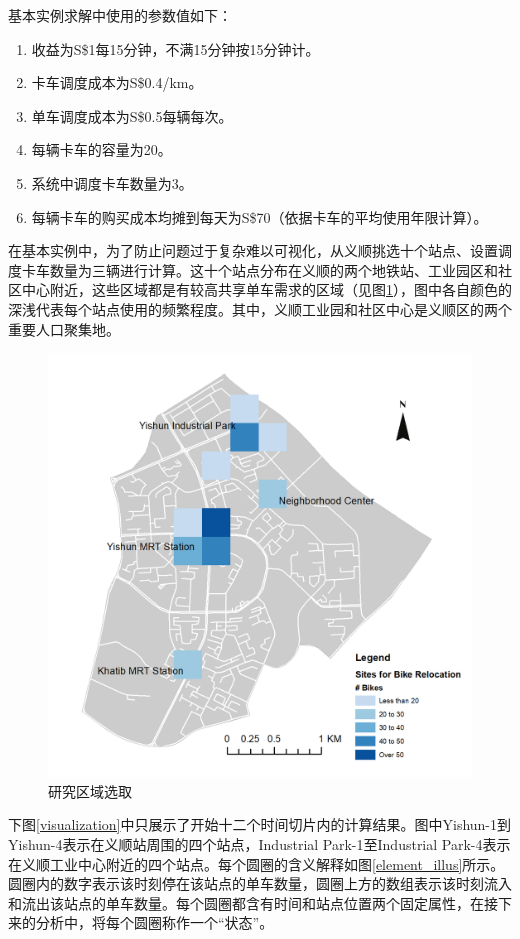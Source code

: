 \documentclass[]{tongjithesis}
\numberwithin{equation}{chapter}
\begin{document}
基本实例求解中使用的参数值如下：
\begin{enumerate}
	\item 收益为S\$1每15分钟，不满15分钟按15分钟计。
	\item 卡车调度成本为S\$0.4/km。
	\item 单车调度成本为S\$0.5每辆每次。
	\item 每辆卡车的容量为20。
	\item 系统中调度卡车数量为3。
	\item 每辆卡车的购买成本均摊到每天为S\$70（依据卡车的平均使用年限计算）。
\end{enumerate}

在基本实例中，为了防止问题过于复杂难以可视化，从义顺挑选十个站点、设置调度卡车数量为三辆进行计算。这十个站点分布在义顺的两个地铁站、工业园区和社区中心附近，这些区域都是有较高共享单车需求的区域（见图\ref{selected10}），图中各自颜色的深浅代表每个站点使用的频繁程度。其中，义顺工业园和社区中心是义顺区的两个重要人口聚集地。

\begin{figure}[H]
    \centering
    \includegraphics[width=0.5 \textwidth]{figures_main/selected_nodes10.png}
    \caption{研究区域选取}
    \label{selected10}
\end{figure}

下图\ref{visualization}中只展示了开始十二个时间切片内的计算结果。图中Yishun-1到Yishun-4表示在义顺站周围的四个站点，Industrial Park-1至Industrial Park-4表示在义顺工业中心附近的四个站点。每个圆圈的含义解释如图\ref{element_illus}所示。圆圈内的数字表示该时刻停在该站点的单车数量，圆圈上方的数组表示该时刻流入和流出该站点的单车数量。每个圆圈都含有时间和站点位置两个固定属性，在接下来的分析中，将每个圆圈称作一个“状态”。
\end{document}
